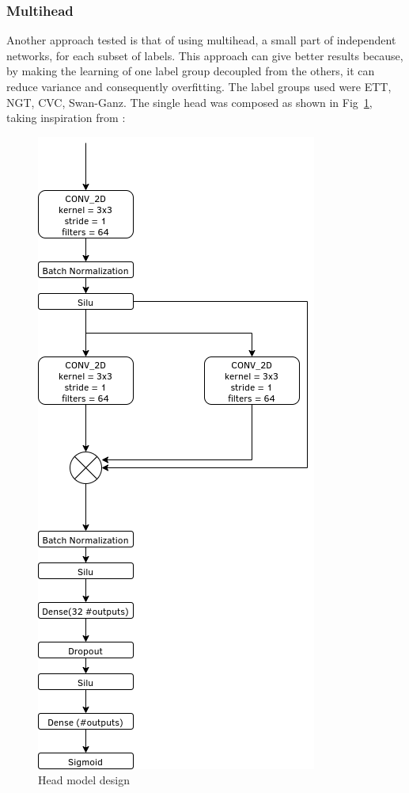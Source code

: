 \documentclass[journal, a4paper]{IEEEtran}
\begin{document}
\subsubsection{Multihead}
Another approach tested is that of using multihead, a small part of independent networks, for each subset of labels. This approach can give better results because, by making the learning of one label group decoupled from the others, it can reduce variance and consequently overfitting. The label groups used were ETT, NGT, CVC, Swan-Ganz. The single head was composed as shown in Fig~\ref{fig:head}, taking inspiration from \cite{REPVGG}:
\begin{figure}[!hbt]
	\begin{center}
		\includegraphics[scale=0.30]{images/head.png}
		\caption{Head model design}
		\label{fig:head}
	\end{center}
\end{figure}
	
\end{document}
